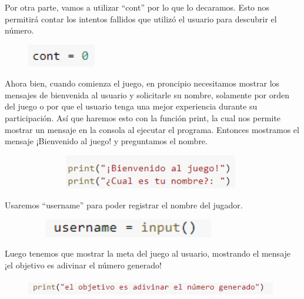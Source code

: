 \documentclass[a4paper,12pt]{article}
\begin{document}
\large{Por otra parte, vamos a utilizar ``cont'' por lo que lo decaramos. Esto nos permitirá contar los intentos fallidos que utilizó el usuario para descubrir el número.}


\begin{figure}[H]
    \caption{}
    \centering \includegraphics[width=3cm, height=1cm]{a_2.png}
    \label{fig1:my_label}
\end{figure}



\large{Ahora bien, cuando comienza el juego, en proncipio necesitamos mostrar los mensajes de bienvenida al usuario y solicitarle su nombre, solamente por orden del juego o por que el usuario tenga una mejor experiencia durante su participación. Así que haremos esto con la función print, la cual nos permite mostrar un mensaje en la consola al ejecutar el programa. Entonces mostramos el mensaje ¡Bienvenido al juego! y preguntamos el nombre.}

\begin{figure}[H]
    \caption{}
    \centering \includegraphics[width=11cm, height=1.5cm]{a_3.png}
    \label{fig1:my_label}
\end{figure}


\large{Usaremos ``username'' para poder registrar el nombre del jugador.}


\begin{figure}[H]
    \caption{}
    \centering \includegraphics[width=9cm, height=0.8cm]{a_6.png}
    \label{fig1:my_label}
\end{figure}


\large{Luego tenemos que mostrar la meta del juego al usuario, mostrando el mensaje ¡el objetivo es adivinar el número generado!}

\begin{figure}[H]
    \caption{}
    \centering \includegraphics[width=11cm, height=0.8cm]{a_5.png}
    \label{fig1:my_label}
\end{figure}
\end{document}
